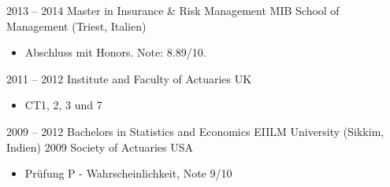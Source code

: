 \documentclass[a4paper,]{fortysecondscv}
\begin{document}
\begin{cvtable}[2]
    \cvitem
    {2013 -- 2014}
    {Master in Insurance \& Risk Management}
    {MIB School of Management (Triest, Italien)}
    {
        \begin{itemize}[nosep, leftmargin=0pt, label={}] %
            \item Abschluss mit Honors. Note: 8.89/10.
        \end{itemize}
    }
    \cvitem
    {2011 -- 2012}
    {Institute and Faculty of Actuaries}
    {UK}
    {
        \vspace{-\topsep}
        \begin{itemize}[nosep, leftmargin=0pt, label={}]
            \item CT1, 2, 3 und 7
        \end{itemize}
    }

    \cvitem
    {2009 -- 2012}
    {Bachelors in Statistics and Economics}
    {EIILM University (Sikkim, Indien)}
    {
        \vspace{-\topsep}
    }
    \cvitem
    {2009}
    {Society of Actuaries}
    {USA}
    {
        \vspace{-\topsep}
        \begin{itemize}[nosep, leftmargin=0pt, label={}]
            \item Prüfung P - Wahrscheinlichkeit, Note 9/10
        \end{itemize}
    }
\end{cvtable}
\end{document}
